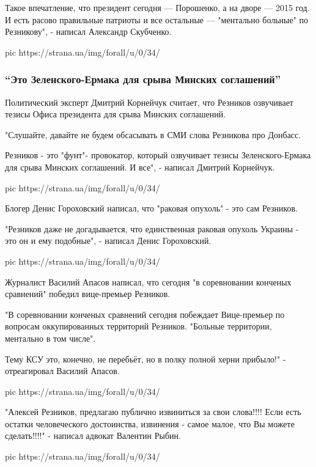 Такое впечатление, что президент сегодня --- Порошенко, а на дворе --- 2015 год. И
есть расово правильные патриоты и все остальные --- "ментально больные" по
Резникову", - написал Александр Скубченко.

\ifcmt
pic https://strana.ua/img/forall/u/0/34/%
\fi 

\subsubsection{\enquote{Это Зеленского-Ермака для срыва Минских соглашений}}

Политический эксперт Дмитрий Корнейчук считает, что Резников озвучивает тезисы
Офиса президента для срыва Минских соглашений.

"Слушайте, давайте не будем обсасывать в СМИ слова Резникова про Донбасс.

Резников - это "фунт"- провокатор, который озвучивает тезисы Зеленского-Ермака
для срыва Минских соглашений. И все", - написал Дмитрий Корнейчук.

\ifcmt
pic https://strana.ua/img/forall/u/0/34/%
\fi

Блогер Денис Гороховский написал, что "раковая опухоль" - это сам Резников.

"Резников даже не догадывается, что единственная раковая опухоль Украины - это
он и ему подобные", - написал Денис Гороховский.

\ifcmt
pic https://strana.ua/img/forall/u/0/34/%
\fi

Журналист Василий Апасов написал, что сегодня "в соревновании конченых
сравнений" победил вице-премьер Резников.

"В соревновании конченых сравнений сегодня побеждает Вице-премьер по вопросам
оккупированных территорий Резников. "Больные территории, ментально в том
числе".

Тему КСУ это, конечно, не перебьёт, но в полку полной херни прибыло!" -
отреагировал Василий Апасов.

\ifcmt
pic https://strana.ua/img/forall/u/0/34/%
\fi

"Алексей Резников, предлагаю публично извиниться за свои слова!!!! Если есть
остатки человеческого достоинства, извинения - самое малое, что Вы можете
сделать!!!!" - написал адвокат Валентин Рыбин.

\ifcmt
pic https://strana.ua/img/forall/u/0/34/%
\fi

